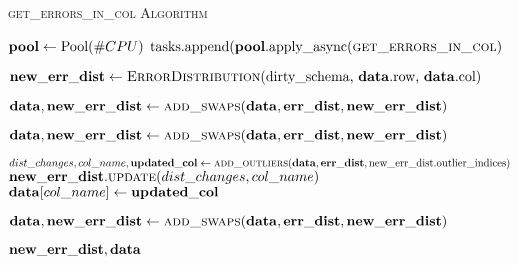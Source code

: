 \begin{algorithm}[!t]
    \caption{\textsc{get\_errors\_in\_col Algorithm}}\label{alg:local_get_errors_in_col}
    \begin{algorithmic}[1] 
	  
	  \STATE $\mathbf{pool} \leftarrow \text{Pool}(\#CPU)$
	   {
        \STATE $\text{tasks.append(\ensuremath{\mathbf{pool}}.apply\_async(\textsc{get\_errors\_in\_col})}$ 
      }\ENDFOR 
      
	  \STATE $\mathbf{new\_err\_dist} \leftarrow \text{\textsc{ErrorDistribution}(dirty\_schema, \ensuremath{\mathbf{data}}.row, \ensuremath{\mathbf{data}}.col)}$
	  
      
      \STATE $\mathbf{data}, \mathbf{new\_err\_dist} \leftarrow \textsc{add\_swaps}(\mathbf{data}, \mathbf{err\_dist}, \mathbf{new\_err\_dist})$ 
      
      \STATE $\mathbf{data}, \mathbf{new\_err\_dist} \leftarrow \textsc{add\_swaps}(\mathbf{data}, \mathbf{err\_dist}, \mathbf{new\_err\_dist})$ 
      
       {
        \STATE $dist\_changes, col\_name, \mathbf{updated\_col} \leftarrow \textsc{add\_outliers}(\mathbf{data}, \mathbf{err\_dist}, \text{new\_err\_dist.outlier\_indices})$ 
        \STATE $\mathbf{new\_err\_dist}.\textsc{update}(dist\_changes, col\_name)$ 
        \STATE $\mathbf{data}[col\_name] \leftarrow \mathbf{updated\_col}$ 
      }\ENDFOR 
      
      \STATE $\mathbf{data}, \mathbf{new\_err\_dist} \leftarrow \textsc{add\_swaps}(\mathbf{data}, \mathbf{err\_dist}, \mathbf{new\_err\_dist})$ 
      
      \RETURN $\mathbf{new\_err\_dist}, \mathbf{data}$
    \end{algorithmic}
\end{algorithm}
